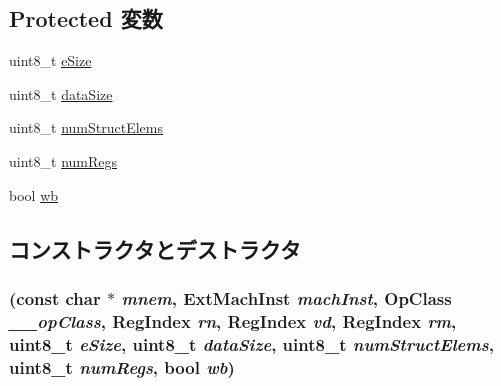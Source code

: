 \subsection*{Protected 変数}
\begin{DoxyCompactItemize}
\item 
uint8\_\-t \hyperlink{classArmISA_1_1VstMultOp64_aac129ded07ba57383c5e2540f22c94ef}{eSize}
\item 
uint8\_\-t \hyperlink{classArmISA_1_1VstMultOp64_af13e629a2f79d14821c7b9246ef99e9f}{dataSize}
\item 
uint8\_\-t \hyperlink{classArmISA_1_1VstMultOp64_afb0be420b537599a5b86558127502040}{numStructElems}
\item 
uint8\_\-t \hyperlink{classArmISA_1_1VstMultOp64_a7a5268882c913c394a8ad4d988eb94e6}{numRegs}
\item 
bool \hyperlink{classArmISA_1_1VstMultOp64_a93541ed16711b2c9c53cf093b675d90b}{wb}
\end{DoxyCompactItemize}


\subsection{コンストラクタとデストラクタ}
\hypertarget{classArmISA_1_1VstMultOp64_a276ccadb6451c16bf40551c3ae4b5cb5}{
\subsubsection[{VstMultOp64}]{ (const char $\ast$ {\em mnem}, \/  {\bf ExtMachInst} {\em machInst}, \/  OpClass {\em \_\-\_\-opClass}, \/  {\bf RegIndex} {\em rn}, \/  {\bf RegIndex} {\em vd}, \/  {\bf RegIndex} {\em rm}, \/  uint8\_\-t {\em eSize}, \/  uint8\_\-t {\em dataSize}, \/  uint8\_\-t {\em numStructElems}, \/  uint8\_\-t {\em numRegs}, \/  bool {\em wb})}}
\label{classArmISA_1_1VstMultOp64_a276ccadb6451c16bf40551c3ae4b5cb5}



